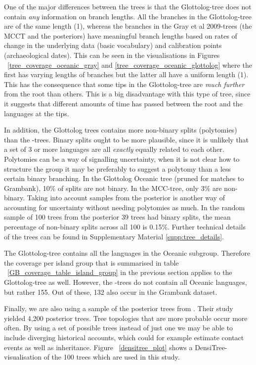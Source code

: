 \documentclass[12pt,letterpaper]{article}
\begin{document}
One of the major differences between the trees is that the Glottolog-tree does not contain \emph{any} information on branch lengths. All the branches in the Glottolog-tree are of the same length (1), whereas the branches in the Gray et al 2009-trees (the MCCT and the posteriors) have meaningful branch lengths based on rates of change in the underlying data (basic vocabulary) and calibration points (archaeological dates). This can be seen in the visualisations in Figures ~\ref{tree_coverage_oceanic_gray} and \ref{tree_coverage_oceanic_glottolog} where the first has varying lengths of branches but the latter all have a uniform length (1). This has the consequence that some tips in the Glottolog-tree are \emph{much further} from the root than others. This is a big disadvantage with this type of tree, since it suggests that different amounts of time has passed between the root and the languages at the tips. 

In addition, the Glottolog trees contains more non-binary splits (polytomies) than the \cite{grayetal_2009}-trees. Binary splits ought to be more plausible, since it is unlikely that a set of 3 or more languages are all \emph{exactly} equally related to each other. Polytomies can be a way of signalling uncertainty, when it is not clear how to structure the group it may be preferably to suggest a polytomy than a less certain binary branching. In the Glottolog Oceanic tree (pruned for matches to Grambank), 10\% of splits are not binary. In the \cite{grayetal_2009} MCC-tree, only 3\% are non-binary. Taking into account samples from the posterior is another way of accounting for uncertainty without needing polytomies as much. In the random sample of 100 trees from the \cite{grayetal_2009} posterior 39 trees had binary splits, the mean percentage of non-binary splits across all 100 is 0.15\%. Further technical details of the trees can be found in Supplementary Material \ref{supp:tree_details}.

The Glottolog-tree contains all the languages in the Oceanic subgroup. Therefore the coverage per island group that is summarised in table ~\ref{GB_coverage_table_island_group} in the previous section applies to the Glottolog-tree as well. However, the \cite{grayetal_2009}-trees do not contain all Oceanic languages, but rather 155. Out of these, 132 also occur in the Grambank dataset. %

Finally, we are also using a sample of the posterior trees from \cite{grayetal_2009}. Their study yielded 4,200 posterior trees. Tree topologies that are more probable occur more often. By using a set of possible trees instead of just one we may be able to include diverging historical accounts, which could for example estimate contact events as well as inheritance. Figure ~\ref{densitree_plot} shows a DensiTree-visualisation \citep{bouckaert2014densitree} of the 100 trees which are used in this study.
\end{document}
